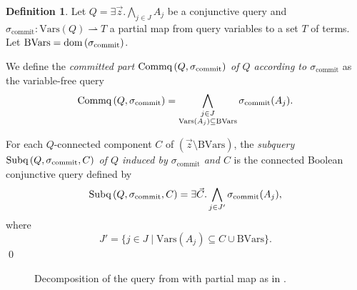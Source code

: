 \documentclass[12pt]{report}
\theoremstyle{plain}
\theoremstyle{definition}
\newtheorem{definition}[theorem]{Definition}
\def\Vars{{\mathrm{Vars}}}
\newcommand{\dom}[1]{\ensuremath{\normalfont{\operatorname{dom}} \left( #1 \right)}}
\newcommand{\Subq}[3]{\ensuremath{\normalfont{\textrm{Subq}} \left( #1, #2, #3 \right)}}
\newcommand{\Commq}[2]{\ensuremath{\normalfont{\textrm{Commq}} \left( #1, #2 \right)}}
\begin{document}
\begin{definition}
\label{definition:query-splitting}
  Let $Q = \exists \vec{z}. \bigwedge_{j \in J} A_j$ be a conjunctive query and $\sigma_{\mathrm{commit}}: \Vars(Q) \rightharpoonup T$ a partial map from query variables to a set $T$ of terms. Let $\mathrm{BVars} = \dom{\sigma_{\mathrm{commit}}}$.

  We define the \emph{committed part $\Commq{Q}{\sigma_{\mathrm{commit}}}$ of $Q$ according to $\sigma_{\mathrm{commit}}$} as the variable-free query
  $$\Commq{Q}{\sigma_{\mathrm{commit}}} = \bigwedge_{\substack{j \in J \\ \Vars(A_j) \subseteq \mathrm{BVars}}} \sigma_{\mathrm{commit}}(A_j).$$

  For each $Q$-connected component $C$ of $(\vec{z} \setminus \mathrm{BVars})$, the \emph{subquery $\Subq{Q}{\sigma_{\mathrm{commit}}}{C}$ of $Q$ induced by $\sigma_{\mathrm{commit}}$ and $C$} is the connected Boolean conjunctive query defined by
  $$\Subq{Q}{\sigma_{\mathrm{commit}}}{C} = \exists \vec{C}. \bigwedge_{j \in J'} \sigma_{\mathrm{commit}}(A_j),$$
  where $$J' = \{ j \in J \mid \Vars(A_j) \subseteq C \cup \mathrm{BVars} \}.$$
  \qed
\end{definition}

\begin{figure}[ht]
  \centering
  
  \caption{Decomposition of the query from  with partial map as in .}
  \label{bcq-decomposition-example-figure}
\end{figure}
\end{document}
